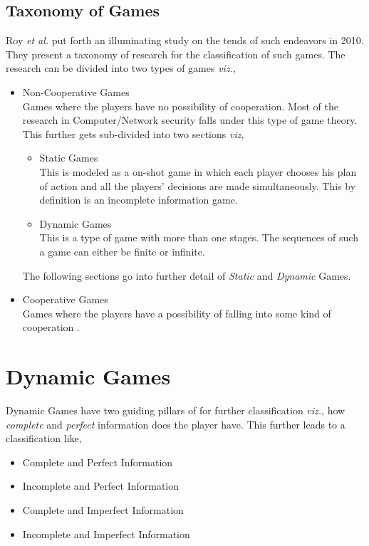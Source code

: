 \documentclass[conference]{IEEEtran}
\begin{document}
\subsection*{Taxonomy of Games}
Roy \textit{et al.}\cite{survey} put forth an illuminating study on the tends of such endeavors in 2010.
They present a taxonomy of research for the classification of such games.
The research can be divided into two types of games \textit{viz.},
\begin{itemize}
    \item{Non-Cooperative Games}\\
        Games where the players have no possibility of cooperation.
        Most of the research in Computer/Network security falls under this type of game theory.
        This further gets sub-divided into two sections \textit{viz},
        \begin{itemize}
            \item{Static Games}\\
            This is modeled as a on-shot game in which each player chooses his plan of action and all the players' decisions are made simultaneously.
            This by definition is an incomplete information game.
            \item{Dynamic Games}\\
            This is a type of game with more than one stages.
            The sequences of such a game can either be finite or infinite.
        \end{itemize}
        The following sections go into further detail of \textit{Static} and \textit{Dynamic} Games.
    \item{Cooperative Games}\\
        Games where the players have a possibility of falling into some kind of cooperation \cite{wiki-coop}.
\end{itemize}

\section*{Dynamic Games}
Dynamic Games have two guiding pillars of for further classification \textit{viz.}, how \textit{complete} and \textit{perfect} information does the player have.
This further leads to a classification like,
\begin{itemize}
    \item Complete and Perfect Information
    \item Incomplete and Perfect Information
    \item Complete and Imperfect Information
    \item Incomplete and Imperfect Information
\end{itemize}
\end{document}
